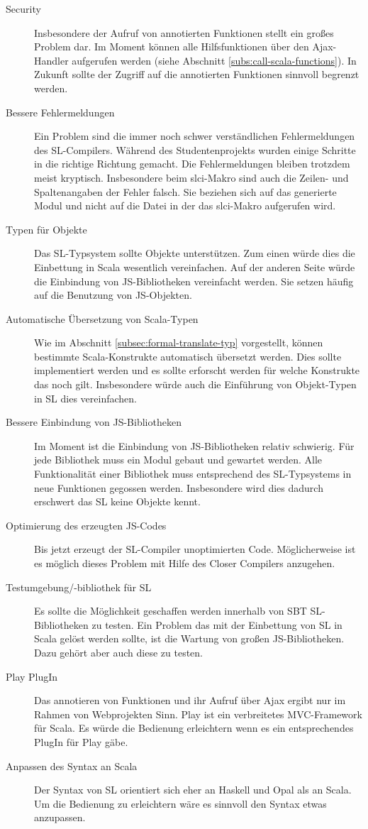 \documentclass[12pt,bibtotoc]{scrreprt}
\begin{document}
\begin{description}
 \item[Security] Insbesondere der Aufruf von annotierten Funktionen stellt ein großes Problem dar. Im Moment können alle Hilfsfunktionen über den Ajax-Handler aufgerufen werden (siehe Abschnitt \ref{subs:call-scala-functions}). In Zukunft sollte der Zugriff auf die annotierten Funktionen sinnvoll begrenzt werden.
 \item[Bessere Fehlermeldungen] Ein Problem sind die immer noch schwer verständlichen Fehlermeldungen des SL-Compilers. Während des Studentenprojekts wurden einige Schritte in die richtige Richtung gemacht. Die Fehlermeldungen bleiben trotzdem meist kryptisch. Insbesondere beim slci-Makro sind auch die Zeilen- und Spaltenangaben der Fehler falsch. Sie beziehen sich auf das generierte Modul und nicht auf die Datei in der das slci-Makro aufgerufen wird. 
 \item[Typen für Objekte] Das SL-Typsystem sollte Objekte unterstützen. Zum einen würde dies die Einbettung in Scala wesentlich vereinfachen. Auf der anderen Seite würde die Einbindung von JS-Bibliotheken vereinfacht werden. Sie setzen häufig auf die Benutzung von JS-Objekten. 
 \item[Automatische Übersetzung von Scala-Typen] Wie im Abschnitt \ref{subsec:formal-translate-typ} vorgestellt, können bestimmte Scala-Konstrukte automatisch übersetzt werden. Dies sollte implementiert werden und es sollte erforscht werden für welche Konstrukte das noch gilt. Insbesondere würde auch die Einführung von Objekt-Typen in SL dies vereinfachen.
 \item[Bessere Einbindung von JS-Bibliotheken] Im Moment ist die Einbindung von JS-Bibliotheken relativ schwierig. Für jede Bibliothek muss ein Modul gebaut und gewartet werden. Alle Funktionalität einer Bibliothek muss entsprechend des SL-Typsystems in neue Funktionen gegossen werden. Insbesondere wird dies dadurch erschwert das SL keine Objekte kennt.
 \item[Optimierung des erzeugten JS-Codes] Bis jetzt erzeugt der SL-Compiler unoptimierten Code. Möglicherweise ist es möglich dieses Problem mit Hilfe des Closer Compilers\cite{} anzugehen.
 \item[Testumgebung/-bibliothek für SL] Es sollte die Möglichkeit geschaffen werden innerhalb von SBT SL-Bibliotheken zu testen. Ein Problem das mit der Einbettung von SL in Scala gelöst werden sollte, ist die Wartung von großen JS-Bibliotheken. Dazu gehört aber auch diese zu testen.
 \item[Play PlugIn] Das annotieren von Funktionen und ihr Aufruf über Ajax ergibt nur im Rahmen von Webprojekten Sinn. Play ist ein verbreitetes MVC-Framework für Scala. Es würde die Bedienung erleichtern wenn es ein entsprechendes PlugIn für Play gäbe. 
 \item[Anpassen des Syntax an Scala] Der Syntax von SL orientiert sich eher an Haskell und Opal als an Scala. Um die Bedienung zu erleichtern wäre es sinnvoll den Syntax etwas anzupassen.
\end{description}
\end{document}
